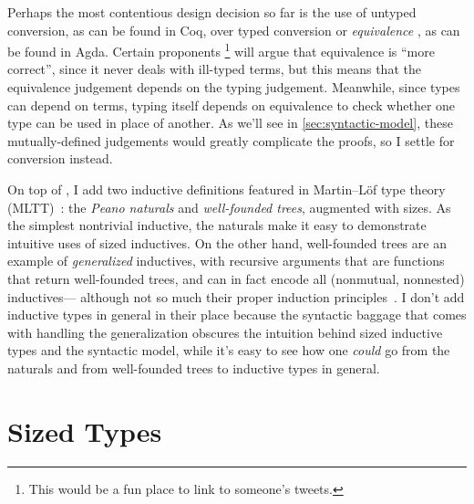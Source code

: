 Perhaps the most contentious design decision so far is the use of untyped conversion,
as can be found in Coq, over typed conversion or \emph{equivalence}%
,
as can be found in Agda.
Certain proponents%
\footnote{This would be a fun place to link to someone's tweets.}
will argue that equivalence is ``more correct'',
since it never deals with ill-typed terms,
but this means that the equivalence judgement depends on the typing judgement.
Meanwhile, since types can depend on terms,
typing itself depends on equivalence to check whether one type can be used in place of another.
As we'll see in \cref{sec:syntactic-model}, these mutually-defined judgements would greatly complicate the proofs,
so I settle for conversion instead.

On top of \GCC, I add two inductive definitions featured in Martin--L\"of type theory (MLTT)~\citep{mltt}:
the \emph{Peano naturals} and \emph{well-founded trees}, augmented with sizes.
As the simplest nontrivial inductive,
the naturals make it easy to demonstrate intuitive uses of sized inductives.
On the other hand, well-founded trees are an example of \emph{generalized} inductives,
with recursive arguments that are functions that return well-founded trees,
and can in fact encode all (nonmutual, nonnested) inductives---%
although not so much their proper induction principles~\citep{W-types}.
I don't add inductive types in general in their place
because the syntactic baggage that comes with handling the generalization
obscures the intuition behind sized inductive types and the syntactic model,
while it's easy to see how one \emph{could} go from the naturals and from well-founded trees
to inductive types in general.

\iffalse
Finally, I add a standard \emph{homogeneous propositional equality type}\index{propositional equality},
which isn't particularly difficult to deal with
and will allow for some more interesting examples.
\fi

\section{Sized Types}\label{sec:sized-types}

